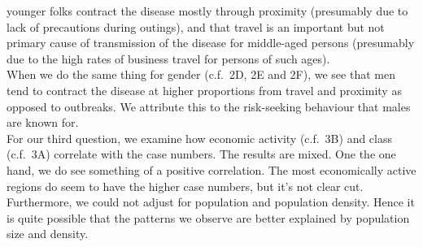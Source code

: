 \documentclass{article}
\begin{document}
younger folks contract the disease mostly through proximity (presumably due to lack of precautions during outings),
and that travel is an important but not primary cause of transmission of the disease for middle-aged persons
(presumably due to the high rates of business travel for persons of such ages).\\
When we do the same thing for gender (c.f.\ 2D, 2E and 2F), we see that men tend to contract the disease at higher proportions
from travel and proximity as opposed to outbreaks. We attribute this to the 
risk-seeking behaviour that males are known for.
\bigskip\\
For our third question, we examine how economic activity (c.f.\ 3B) and class (c.f.\ 3A) correlate with the case numbers.
The results are mixed. One the one hand, we do see something of a positive correlation.
The most economically active regions do seem to have the higher case numbers, but it's not clear cut.
Furthermore, we could not adjust for population and population density.
Hence it is quite possible that the patterns we observe are better explained by
population size and density.
\end{document}
